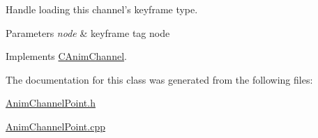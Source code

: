 Handle loading this channel's keyframe type. 


\begin{DoxyParams}{Parameters}
{\em node} & keyframe tag node \\
\hline
\end{DoxyParams}


Implements \hyperlink{class_c_anim_channel_a2df7b3fed2b3faf34c585446628fc874}{C\+Anim\+Channel}.



The documentation for this class was generated from the following files\+:\begin{DoxyCompactItemize}
\item 
\hyperlink{_anim_channel_point_8h}{Anim\+Channel\+Point.\+h}\item 
\hyperlink{_anim_channel_point_8cpp}{Anim\+Channel\+Point.\+cpp}\end{DoxyCompactItemize}

